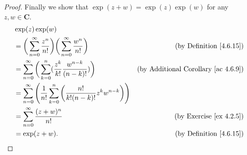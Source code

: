 \begin{proof}
    Finally we show that \(\exp(z + w) = \exp(z) \exp(w)\) for any \(z, w \in \mathbf{C}\).
    \begin{align*}
         & \exp(z) \exp(w)                                                                                                                                                  \\
         & = \bigg(\sum_{n = 0}^\infty \frac{z^n}{n!}\bigg) \bigg(\sum_{n = 0}^\infty \frac{w^n}{n!}\bigg)                & \text{(by Definition \ref{4.6.15})}             \\
         & = \sum_{n = 0}^\infty \bigg(\sum_{k = 0}^n (\frac{z^k}{k!} \frac{w^{n - k}}{(n - k)!})\bigg)                   & \text{(by Additional Corollary \ref{ac 4.6.9})} \\
         & = \sum_{n = 0}^\infty \Bigg(\frac{1}{n!} \sum_{k = 0}^n \bigg(\frac{n!}{k! (n - k)!} z^k w^{n - k}\bigg)\Bigg)                                                   \\
         & = \sum_{n = 0}^\infty \frac{(z + w)^n}{n!}                                                                     & \text{(by Exercise \ref{ex 4.2.5})}             \\
         & = \exp(z + w).                                                                                                 & \text{(by Definition \ref{4.6.15})}
    \end{align*}
\end{proof}